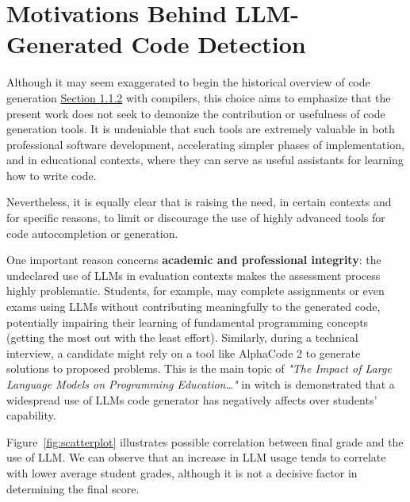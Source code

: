 \clearpage
\section{Motivations Behind LLM-Generated Code Detection}
Although it may seem exaggerated to begin the historical 
overview of code generation 
\hyperref[sec:Code_Generator]{Section 1.1.2} with compilers, 
this choice aims to emphasize that the present work does not 
seek to demonize the contribution or usefulness of code 
generation tools. It is undeniable that such tools are 
extremely valuable in both professional software development, 
accelerating simpler phases of implementation, and 
in educational contexts, where they can serve as 
useful assistants for learning how to write code.

Nevertheless, it is equally clear that is raising 
the need, in certain contexts 
and for specific reasons, to limit or discourage 
the use of highly advanced tools for code autocompletion 
or generation.

\vspace{1\baselineskip}
\noindent

One important reason concerns \textbf{academic and 
professional integrity}: the undeclared use of 
LLMs in evaluation contexts makes the assessment 
process highly problematic. Students, for example, 
may complete assignments or even exams using LLMs 
without contributing meaningfully to the generated 
code, potentially impairing their learning of 
fundamental programming concepts 
(getting the most out with the least effort). Similarly, 
during a technical interview, a candidate might 
rely on a tool like AlphaCode 2 to generate solutions 
to proposed problems.
This is the main topic of
\textit{"The Impact of Large Language Models on 
Programming Education…"} \cite{Jost2024LLM}
in witch is demonstrated that a widespread use of 
LLMs code generator has negatively affects 
over students' capability.

Figure~\ref{fig:scatterplot} illustrates 
possible correlation between final grade and the
use of LLM. We can observe that an increase 
in LLM usage tends to correlate with lower 
average student grades, although it is not a 
decisive factor in determining the final score.


